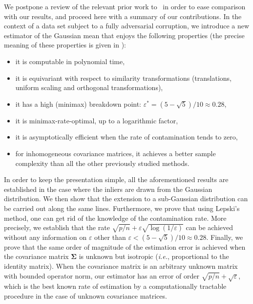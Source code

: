 \documentclass[aos,preprint,reqno]{imsart}
\newcommand\bSigma{\boldsymbol\Sigma}
\theoremstyle{plain}
\theoremstyle{remark}
\begin{document}
    We postpone a review of the relevant prior work 
    to~ in order to ease comparison with
    our results, and proceed here with a summary of our 
    contributions. In the 
    context of a data set subject to a fully adversarial 
    corruption, we introduce a new estimator of the Gaussian 
    mean that enjoys the following properties (the precise 
    meaning of these properties is given in ):
    \vspace{-5pt}
	\begin{itemize}
	\item it is computable in polynomial time,
	\item it is equivariant with respect to similarity transformations 
	(translations, uniform scaling and orthogonal transformations),
	\item it has a high (minimax) breakdown point: $\varepsilon^* 
	= (5-\sqrt{5})/10\approx 0.28$,
	\item it is minimax-rate-optimal, up to a logarithmic factor,
	\item it is asymptotically efficient when the rate of 
	contamination tends to zero,
	\item for inhomogeneous covariance matrices, it achieves a 
	better sample complexity than all the other previously 
	studied methods.
	\end{itemize}
    
    In order to keep the presentation simple, all the aforementioned
    results are established in the case where the inliers are
    drawn from the Gaussian distribution. We then show that the
    extension to a sub-Gaussian distribution can be carried out
    along the same lines. Furthermore, we prove that using Lepski's
    method, one can get rid of the knowledge of the contamination
    rate. More precisely, we establish that the rate $\sqrt{p/n} + 
    \varepsilon\sqrt{\log(1/\varepsilon)}$ can be achieved without
    any information on $\varepsilon$ other than $\varepsilon < 
    (5-\sqrt{5})/10\approx 0.28$. Finally, we prove that the same
    order of magnitude of the estimation error is achieved when the 
    covariance matrix $\bSigma$ is unknown but isotropic (\textit{i.e.}, 
    proportional to the identity matrix). When the covariance matrix
    is an arbitrary unknown matrix with bounded operator norm, our 
    estimator has an error of order $\sqrt{p/n} + \sqrt{\varepsilon}$, 
    which is the best known rate of estimation by a computationally 
    tractable procedure in the case of unknown covariance matrices.
    
\end{document}
